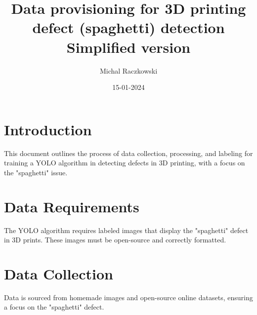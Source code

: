 \documentclass[12pt,a4paper]{article}
\title{{\textbf{Data provisioning for 3D printing defect (spaghetti) detection}\\ {\small Simplified version}}}
\author{Michal Raczkowski}
\date{15-01-2024}
\begin{document}
\maketitle
\thispagestyle{empty} %

\newpage
\tableofcontents
\newpage

\setcounter{page}{1} %

\section{Introduction}
This document outlines the process of data collection, processing, and labeling for training a YOLO algorithm in detecting defects in 3D printing, with a focus on the "spaghetti" issue.

\section{Data Requirements}
The YOLO algorithm requires labeled images that display the "spaghetti" defect in 3D prints. These images must be open-source and correctly formatted.

\section{Data Collection}
Data is sourced from homemade images and open-source online datasets, ensuring a focus on the "spaghetti" defect.
\end{document}
